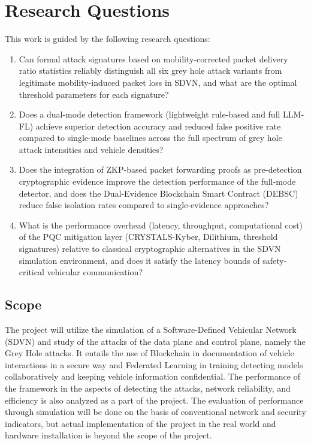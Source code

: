 \documentclass[12pt, a4paper]{report}
\begin{document}
\section{Research Questions}
\label{sec:rq}

This work is guided by the following research questions:

\begin{enumerate}
  \item[\textbf{RQ1.}] Can formal attack signatures based on mobility-corrected
  packet delivery ratio statistics reliably distinguish all six grey hole attack
  variants from legitimate mobility-induced packet loss in SDVN, and what are
  the optimal threshold parameters for each signature?

  \item[\textbf{RQ2.}] Does a dual-mode detection framework (lightweight
  rule-based and full LLM-FL) achieve superior detection accuracy and reduced
  false positive rate compared to single-mode baselines across the full spectrum
  of grey hole attack intensities and vehicle densities?

  \item[\textbf{RQ3.}] Does the integration of ZKP-based packet forwarding
  proofs as pre-detection cryptographic evidence improve the detection performance
  of the full-mode detector, and does the Dual-Evidence Blockchain Smart Contract
  (DEBSC) reduce false isolation rates compared to single-evidence approaches?

  \item[\textbf{RQ4.}] What is the performance overhead (latency, throughput,
  computational cost) of the PQC mitigation layer (CRYSTALS-Kyber, Dilithium,
  threshold signatures) relative to classical cryptographic alternatives in the
  SDVN simulation environment, and does it satisfy the latency bounds of
  safety-critical vehicular communication?
\end{enumerate}

\subsection{Scope}

The project will utilize the simulation of a Software-Defined Vehicular Network (SDVN) and study of the attacks of the data plane and control plane, namely the Grey Hole attacks. It entails the use of Blockchain in documentation of vehicle interactions in a secure way and Federated Learning in training detecting models collaboratively and keeping vehicle information confidential. The performance of the framework in the aspects of detecting the attacks, network reliability, and efficiency is also analyzed as a part of the project. The evaluation of performance through simulation will be done on the basis of conventional network and security indicators, but actual implementation of the project in the real world and hardware installation is beyond the scope of the project.
\end{document}
